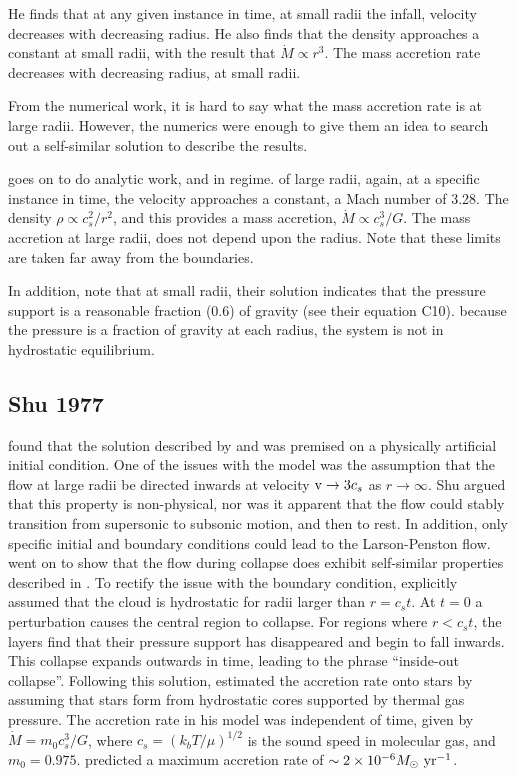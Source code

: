 \documentclass[../dissertation.tex]{subfiles}
\begin{document}
He finds that at any given instance in time, at small radii the infall, velocity decreases with decreasing radius.
He also finds that the density approaches a constant at small radii, with the result that $\dot{M} \propto r^3 $. 
The mass accretion rate decreases with decreasing radius, at small radii.

From the numerical work, it is hard to say what the mass accretion rate is at large radii. 
However, the numerics were enough to give them an idea to search out a self-similar solution to describe the results.

\citet{1969MNRAS.145..271L} goes on to do analytic work, and in regime. 
of large radii, again, at a specific instance in time, the velocity approaches a constant, a Mach number of 3.28. 
The density $\rho \propto c_s^2 / r^2$, and this provides a mass accretion, $\dot{M} \propto c_s^3 / G$. 
The mass accretion at large radii, does not depend upon the radius. 
Note that these limits are taken far away from the boundaries.

In addition, \citet{1969MNRAS.145..271L} note that at small radii, their solution indicates that the pressure support is a reasonable fraction (0.6) of gravity (see their equation C10). 
because the  pressure is a fraction of gravity at each radius, the system is not in hydrostatic equilibrium.

\subsection{Shu 1977} \label{subsec:Shu_review}
\citet{1977ApJ...214..488S} found that the solution described by \citet{1969MNRAS.145..271L} and \citet{1969MNRAS.144..425P} was premised on a physically artificial initial condition.
One of the issues with the model was the assumption that the flow at large radii be directed inwards at velocity ${\rm v} \rightarrow 3c_s$ as $r \rightarrow \infty$. 
Shu argued that this property is non-physical, nor was it apparent that the flow could stably transition from supersonic to subsonic motion, and then to rest. 
In addition, only specific initial and boundary conditions could lead to the Larson-Penston flow.
\citet{1977ApJ...214..488S} went on to show that the flow during collapse does exhibit self-similar properties described in \citet{1969MNRAS.145..271L}.
To rectify the issue with the boundary condition, \citet{1977ApJ...214..488S} explicitly assumed that the cloud is hydrostatic for radii larger than $r = c_s t$. 
At $t=0$ a perturbation causes the central region to collapse. 
For regions where $r < c_s t$, the layers find that their pressure support has disappeared and begin to fall inwards. 
This collapse expands outwards in time, leading to the phrase ``inside-out collapse''. 
Following this solution, \citet{1977ApJ...214..488S} estimated the accretion rate onto 
stars by assuming that stars form from hydrostatic cores supported by thermal gas pressure. 
The accretion rate in his model was independent of time, given by $\dot{M} = m_0c_s^3/G$, where $c_s = (k_b T / \mu)^{1/2}$  is the sound
speed in molecular gas, and $m_0 = 0.975$. 
\citet{1977ApJ...214..488S} predicted a maximum accretion rate of $\sim 2\times10^{-6} M_\odot\,\,\rm yr^{-1}$.
\end{document}
